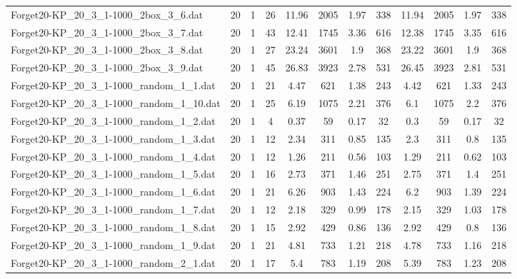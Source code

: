 \begin{sidewaystable}[!ht]
{\begin{tabular}{lccccccccccc}
Forget20-KP\_20\_3\_1-1000\_2box\_3\_6.dat & 20 & 1 & 26 & 11.96 & 2005 &  \textcolor{blue2}{1.97} & 338 & 11.94 & 2005 &  \textcolor{blue2}{1.97} & 338 \\
Forget20-KP\_20\_3\_1-1000\_2box\_3\_7.dat & 20 & 1 & 43 & 12.41 & 1745 & 3.36 & 616 & 12.38 & 1745 &  \textcolor{blue2}{3.35} & 616 \\
Forget20-KP\_20\_3\_1-1000\_2box\_3\_8.dat & 20 & 1 & 27 & 23.24 & 3601 &  \textcolor{blue2}{1.9} & 368 & 23.22 & 3601 &  \textcolor{blue2}{1.9} & 368 \\
Forget20-KP\_20\_3\_1-1000\_2box\_3\_9.dat & 20 & 1 & 45 & 26.83 & 3923 &  \textcolor{blue2}{2.78} & 531 & 26.45 & 3923 & 2.81 & 531 \\
Forget20-KP\_20\_3\_1-1000\_random\_1\_1.dat & 20 & 1 & 21 & 4.47 & 621 & 1.38 & 243 & 4.42 & 621 &  \textcolor{blue2}{1.33} & 243 \\
Forget20-KP\_20\_3\_1-1000\_random\_1\_10.dat & 20 & 1 & 25 & 6.19 & 1075 & 2.21 & 376 & 6.1 & 1075 &  \textcolor{blue2}{2.2} & 376 \\
Forget20-KP\_20\_3\_1-1000\_random\_1\_2.dat & 20 & 1 & 4 & 0.37 & 59 &  \textcolor{blue2}{0.17} & 32 & 0.3 & 59 &  \textcolor{blue2}{0.17} & 32 \\
Forget20-KP\_20\_3\_1-1000\_random\_1\_3.dat & 20 & 1 & 12 & 2.34 & 311 & 0.85 & 135 & 2.3 & 311 &  \textcolor{blue2}{0.8} & 135 \\
Forget20-KP\_20\_3\_1-1000\_random\_1\_4.dat & 20 & 1 & 12 & 1.26 & 211 &  \textcolor{blue2}{0.56} & 103 & 1.29 & 211 & 0.62 & 103 \\
Forget20-KP\_20\_3\_1-1000\_random\_1\_5.dat & 20 & 1 & 16 & 2.73 & 371 & 1.46 & 251 & 2.75 & 371 & 1.4 & 251 \\
Forget20-KP\_20\_3\_1-1000\_random\_1\_6.dat & 20 & 1 & 21 & 6.26 & 903 & 1.43 & 224 & 6.2 & 903 &  \textcolor{blue2}{1.39} & 224 \\
Forget20-KP\_20\_3\_1-1000\_random\_1\_7.dat & 20 & 1 & 12 & 2.18 & 329 &  \textcolor{blue2}{0.99} & 178 & 2.15 & 329 & 1.03 & 178 \\
Forget20-KP\_20\_3\_1-1000\_random\_1\_8.dat & 20 & 1 & 15 & 2.92 & 429 & 0.86 & 136 & 2.92 & 429 &  \textcolor{blue2}{0.8} & 136 \\
Forget20-KP\_20\_3\_1-1000\_random\_1\_9.dat & 20 & 1 & 21 & 4.81 & 733 & 1.21 & 218 & 4.78 & 733 &  \textcolor{blue2}{1.16} & 218 \\
Forget20-KP\_20\_3\_1-1000\_random\_2\_1.dat & 20 & 1 & 17 & 5.4 & 783 & 1.19 & 208 & 5.39 & 783 & 1.23 & 208 \\

\end{tabular}}
\end{sidewaystable}
